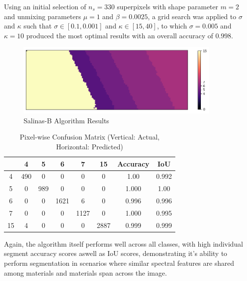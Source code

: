 Using an initial selection of $n_s = 330$ superpixels with shape parameter $m=2$ and unmixing parameters $\mu = 1$ and $\beta = 0.0025$, a grid search was applied to $\sigma$ and $\kappa$ such that $\sigma \in [0.1, 0.001]$ and $\kappa \in [15, 40]$, to which $\sigma = 0.005$ and $\kappa = 10$ produced the most optimal results with an overall accuracy of $0.998$. 
\begin{figure}[H]
    \centering
    \includegraphics[width=10cm]{salinas-b-labelled.png}  %
    \caption{Salinas-B Algorithm Results}
    \label{salina-b-results}  %
\end{figure}
\begin{table}[H]
    \centering
    \label{tab:salinas_b_cfm}
    \begin{tabular}{|c|ccccc|c|c|}
        \hline
         & \textbf{4} & \textbf{5} & \textbf{6} & \textbf{7} & \textbf{15} & \textbf{Accuracy} & \textbf{IoU} \\ \hline
        4      &  490    &  0    &  0    &  0        &  0    &  1.00 & 0.992  \\ 
        5      &  0    & 989  &  0    &  0        &  0    &  1.000   & 1.00\\ 
        6      &  0    &  0    &  1621  &  6       &  0    &  0.996  & 0.996\\ 
        7      &  0    &  0    &  0    & 1127    &  0    &  1.000  & 0.995\\ 
        15      &  4   &  0    &  0    &  0      &  2887    &  0.999  & 0.999\\ \hline
    \end{tabular}
    \caption{Pixel-wise Confusion Matrix (Vertical: Actual, Horizontal: Predicted)}
\end{table}
Again, the algorithm itself performs well across all classes, with high individual segment accuracy scores aswell as IoU scores, demonstrating it's ability to perform segmentation in scenarios where similar spectral features are shared among materials and materials span across the image.

    


